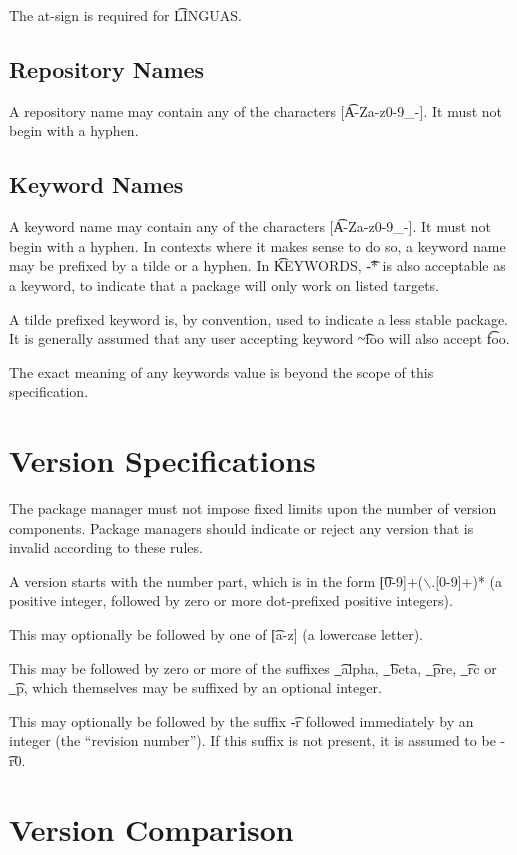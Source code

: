 \note The at-sign is required for \t{LINGUAS}.

\subsection{Repository Names}
\label{sec:repository-names}
A repository name may contain any of the characters [\t{A-Za-z0-9\_-}]. It must not begin with a
hyphen.

\subsection{Keyword Names}
\label{sec:keyword-names}
A keyword name may contain any of the characters [\t{A-Za-z0-9\_-}]. It must not begin with a
hyphen. In contexts where it makes sense to do so, a keyword name may be prefixed by
a tilde or a hyphen. In \t{KEYWORDS}, \t{-*} is also acceptable as a keyword, to indicate that
a package will only work on listed targets.

A tilde prefixed keyword is, by convention, used to indicate a less stable package. It is generally
assumed that any user accepting keyword \t{\textasciitilde{}foo} will also accept \t{foo}.

The exact meaning of any keywords value is beyond the scope of this specification.

\section{Version Specifications}
The package manager must not impose fixed limits upon the number of version components. Package
managers should indicate or reject any version that is invalid according to these rules.

A version starts with the number part, which is in the form \t{[0-9]+($\backslash$.[0-9]+)*} (a positive
integer, followed by zero or more dot-prefixed positive integers).

This may optionally be followed by one of \t{[a-z]} (a lowercase letter).

This may be followed by zero or more of the suffixes \t{\_alpha}, \t{\_beta}, \t{\_pre},
\t{\_rc} or \t{\_p}, which themselves may be suffixed by an optional integer.

This may optionally be followed by the suffix \t{-r} followed immediately by an integer (the
``revision number''). If this suffix is not present, it is assumed to be \t{-r0}.

\section{Version Comparison}


